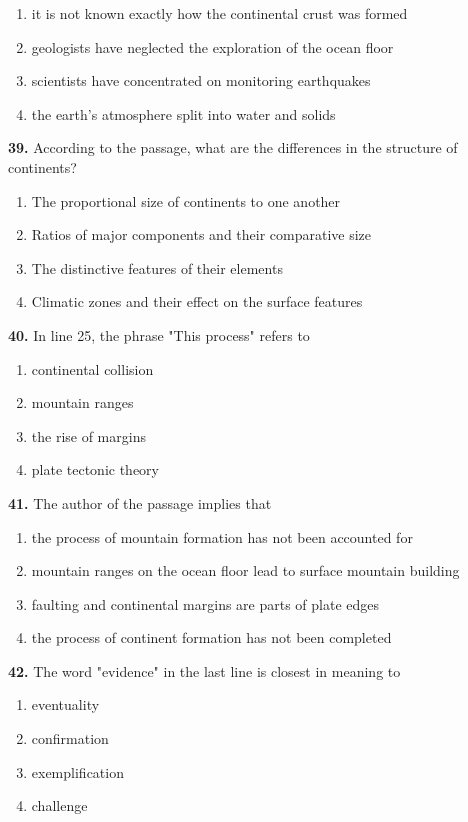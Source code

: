 \documentclass[12pt]{article}
\begin{document}
\begin{enumerate}[label=(\Alph*),leftmargin=*,itemsep=0.2em]
\item it is not known exactly how the continental crust was formed
\item geologists have neglected the exploration of the ocean floor
\item scientists have concentrated on monitoring earthquakes
\item the earth's atmosphere split into water and solids
\end{enumerate}
\par
\vspace{0.25\baselineskip}
\noindent\textbf{39.} According to the passage, what are the differences in the structure of continents?
\begin{enumerate}[label=(\Alph*),leftmargin=*,itemsep=0.2em]
\item The proportional size of continents to one another
\item Ratios of major components and their comparative size
\item The distinctive features of their elements
\item Climatic zones and their effect on the surface features
\end{enumerate}
\par
\vspace{0.25\baselineskip}
\noindent\textbf{40.} In line 25, the phrase "This process" refers to
\begin{enumerate}[label=(\Alph*),leftmargin=*,itemsep=0.2em]
\item continental collision
\item mountain ranges
\item the rise of margins
\item plate tectonic theory
\end{enumerate}
\par
\vspace{0.25\baselineskip}
\noindent\textbf{41.} The author of the passage implies that
\begin{enumerate}[label=(\Alph*),leftmargin=*,itemsep=0.2em]
\item the process of mountain formation has not been accounted for
\item mountain ranges on the ocean floor lead to surface mountain building
\item faulting and continental margins are parts of plate edges
\item the process of continent formation has not been completed
\end{enumerate}
\par
\vspace{0.25\baselineskip}
\noindent\textbf{42.} The word "evidence" in the last line is closest in meaning to
\begin{enumerate}[label=(\Alph*),leftmargin=*,itemsep=0.2em]
\item eventuality
\item confirmation
\item exemplification
\item challenge
\end{enumerate}
\par
\vspace{0.25\baselineskip}
\end{document}
